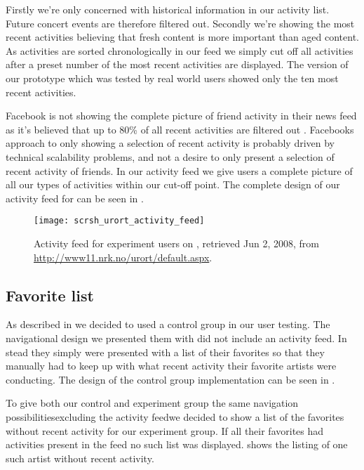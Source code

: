 Firstly we're only concerned with historical information in our activity list.
Future concert events are therefore filtered out. Secondly we're showing the
most recent activities believing that fresh content is more important than
aged content. As activities are sorted chronologically in our feed we simply
cut off all activities after a preset number of the most recent activities are
displayed. The version of our prototype which was tested by real world users
showed only the ten most recent activities.

Facebook is not showing the complete picture of friend activity in their news
feed as it's believed that up to 80\% of all recent activities are filtered
out \citep{mccrea08}.
Facebooks approach to only showing a selection of recent activity is
probably driven by technical scalability problems, and not a desire to only
present a selection of recent activity of friends. In our activity feed we
give users a complete picture of all our types of activities within our
cut-off point.
The complete design of our activity feed for \urort{} can be seen in
.

\begin{figure}
  \texttt{[image: scrsh\_urort\_activity\_feed]}
  \caption[\urort{} Activity Feed]{
    Activity feed for experiment users on \urort{},
    retrieved Jun 2, 2008, from
    \url{http://www11.nrk.no/urort/default.aspx}.
  }
  \label{figure:scrsh.urort.activity.feed}
\end{figure}

\subsection{Favorite list}
\label{section:implementation.design.favorite.list}

As described in
we decided to used a control group in our user testing. The navigational
design we presented them with did not include an activity feed. In stead they
simply were presented with a list of their favorites so that they manually had
to keep up with what recent activity their favorite artists were conducting.
The design of the control group implementation can be seen in
.

To give both our control and experiment group the same navigation
possibilities\dash{}excluding the activity feed\dash{}we decided to show a
list of the favorites without recent activity for our experiment group. If all
their favorites had activities present in the feed no such list was displayed.
 shows the listing of one such artist
without recent activity.

